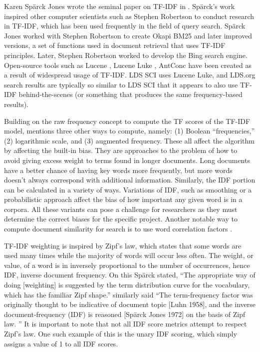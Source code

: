 Karen Sp\"{a}rck Jones wrote the seminal paper on TF-IDF in \citeyear{sparck1972statistical} \citep{sparck1972statistical}. 
Sp\"{a}rck's work inspired other computer scientists such as Stephen Robertson to conduct research in TF-IDF, which has been used frequently in the field of query search. Sp\"{a}rck Jones worked with Stephen Robertson to create Okapi BM25 and later improved versions, a set of functions used in document retrieval that uses TF-IDF principles. Later, Stephen Robertson worked to develop the Bing search engine. Open-source tools such as Lucene \citep{McCandless:2010:LAS:1893016}, Lucene Luke \citep{lucene:luke}, AntConc \citep{anthony_2013} have been created as a result of widespread usage of TF-IDF. LDS SCI uses Lucene Luke, and LDS.org search results are typically so similar to LDS SCI that it appears to also use TF-IDF behind-the-scenes (or something that produces the same frequency-based results).

Building on the raw frequency concept to compute the TF scores of the TF-IDF model, \citet{manning_raghavan_2008_scoring} mentions three other ways to compute, namely: (1) Boolean ``frequencies,'' (2) logarithmic scale, and (3) augmented frequency. These all affect the algorithm by affecting the built-in bias. They are approaches to the problem of how to avoid giving excess weight to terms found in longer documents. Long documents have a better chance of having key words more frequently, but more words doesn't always correspond with additional information.  Similarly, the IDF portion can be calculated in a variety of ways. Variations of IDF, such as smoothing or a probabilistic approach affect the bias of how important any given word is in a corpora. All these variants can pose a challenge for researchers as they must determine the correct biases for the specific project. Another notable way to compute document similarity for search is to use word correlation factors \citep{won2007using}.

TF-IDF weighting is inspired by Zipf's law, which states that some words are used many times while the majority of words will occur less often. The weight, or value, of a word is in inversely proportional to the number of occurrences, hence IDF, inverse document frequency. On this Sp\"{a}rck stated, ``The appropriate way of doing [weighting] is suggested by the term distribution curve for the vocabulary, which has the familiar Zipf shape.'' \citeauthor{Wu:2008:Interpreting_tf_idf_term_weights} similarly said ``The term-frequency factor was originally thought to be indicative of document topic [Luhn 1958], and the inverse document-frequency (IDF) is reasoned [Sp\"arck Jones 1972] on the basis of Zipf law. \citeyearpar{Wu:2008:Interpreting_tf_idf_term_weights}'' It is important to note that not all IDF score metrics attempt to respect Zipf's law. One such example of this is the unary IDF scoring, which simply assigns a value of 1 to all IDF scores.

